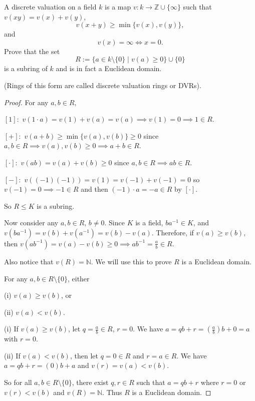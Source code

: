 \documentclass[addpoints,10pt]{exam}
\theoremstyle{plain}
\theoremstyle{definition}
\newtheorem{prob}[thm]{Problem}
\theoremstyle{plain}
\theoremstyle{definition}
\let\oldprob\prob
\let\endoldprob\endprob
\renewenvironment{prob}
  {\begin{singlespace}\oldprob}
  {\endoldprob\end{singlespace}}
\newcommand{\NN}{\ensuremath{\mathbb{N}}}
\newcommand{\ZZ}{\ensuremath{\mathbb{Z}}}
\begin{document}
\setcounter{thm}{0}

\begin{prob}
A discrete valuation on a field $k$ is a map $v : k \to \ZZ \cup \{\infty\}$ such that $v(xy)=v(x)+v(y)$,
\[
v(x+y)\geq \min\{v(x),v(y)\},
\]
and
\[
v(x)=\infty \iff x=0.
\]
Prove that the set
\[
R:=\{a\in k\setminus\{0\}\mid v(a)\geq 0\}\cup\{0\}
\]
is a subring of $k$ and is in fact a Euclidean domain.

(Rings of this form are called discrete valuation rings or DVRs).
\end{prob}

\begin{proof}
For any $a,b\in R$,

$[1]:$
$v(1\cdot a)=v(1)+v(a)=v(a)\implies v(1)=0\implies 1\in R$.

$[+]:$
$v(a+b)\geq \min\{v(a),v(b)\}\geq 0$
since $a,b\in R\implies v(a),v(b)\geq 0\implies a+b\in R$.

$[\cdot]:$
$v(ab)=v(a)+v(b)\geq 0$
since $a,b\in R\implies ab\in R$.

$[-]:$
$v((-1)(-1))=v(1)=v(-1)+v(-1)=0$
so $v(-1)=0\implies -1\in R$ and then
$(-1)\cdot a=-a\in R$ by $[\cdot]$.

So $R\leq K$ is a subring.

Now consider any $a,b\in R$, $b\neq 0$. Since $K$ is a field,
$ba^{-1}\in K$, and
$v(ba^{-1})=v(b)+v(a^{-1})=v(b)-v(a)$.
Therefore, if $v(a)\geq v(b)$, then
$v(ab^{-1})=v(a)-v(b)\geq 0\implies ab^{-1}=\frac{a}{b}\in R$.

Also notice that $v(R)=\NN$. We will use this to prove $R$ is a
Euclidean domain.

For any $a,b\in R\setminus\{0\}$, either

(i) $v(a)\geq v(b)$, or

(ii) $v(a)<v(b)$.

(i) If $v(a)\geq v(b)$, let
$q=\frac{a}{b}\in R$, $r=0$. We have
$a=qb+r=\left(\frac{a}{b}\right)b+0=a$
with $r=0$.

(ii) If $v(a)<v(b)$, then let
$q=0\in R$ and $r=a\in R$. We have
$a=qb+r=(0)b+a$
and
$v(r)=v(a)<v(b)$.

So for all $a,b\in R\setminus\{0\}$, there exist $q,r\in R$ such that
$a=qb+r$ where $r=0$ or $v(r)<v(b)$ and $v(R)=\NN$. Thus $R$ is a
Euclidean domain.
\end{proof}
\end{document}
